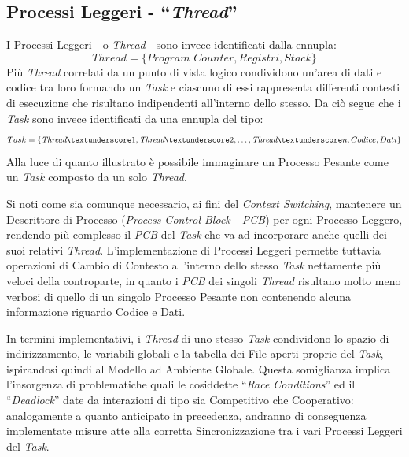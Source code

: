 \subsection{Processi Leggeri - ``\textit{Thread}''}
I Processi Leggeri - o \textit{Thread} - sono invece identificati dalla ennupla:
$$ Thread = \{\textit{Program Counter}, Registri, \textit{Stack}\} $$
Più \textit{Thread} correlati da un punto di vista logico condividono un'area di dati e codice tra loro formando un \textit{Task} e ciascuno di essi rappresenta differenti contesti di esecuzione che risultano indipendenti all'interno dello stesso. Da ciò segue che i \textit{Task} sono invece identificati da una ennupla del tipo:
$$ Task = \{\emph{Thread}\textunderscore 1, \emph{Thread}\textunderscore 2, \dots, \emph{Thread}\textunderscore n, Codice, Dati\} $$
Alla luce di quanto illustrato è possibile immaginare un Processo Pesante come un \textit{Task} composto da un solo \textit{Thread}. \par
Si noti come sia comunque necessario, ai fini del \textit{Context Switching}, mantenere un Descrittore di Processo (\textit{Process Control Block - PCB}) per ogni Processo Leggero, rendendo più complesso il \textit{PCB} del \textit{Task} che va ad incorporare anche quelli dei suoi relativi \textit{Thread}. L'implementazione di Processi Leggeri permette tuttavia operazioni di Cambio di Contesto all'interno dello stesso \textit{Task} nettamente più veloci della controparte, in quanto i \textit{PCB} dei singoli \textit{Thread} risultano molto meno verbosi di quello di un singolo Processo Pesante non contenendo alcuna informazione riguardo Codice e Dati. \par
In termini implementativi, i \textit{Thread} di uno stesso \textit{Task} condividono lo spazio di indirizzamento, le variabili globali e la tabella dei File aperti proprie del \textit{Task}, ispirandosi quindi al Modello ad Ambiente Globale. Questa somiglianza implica l'insorgenza di problematiche quali le cosiddette ``\textit{Race Conditions}'' ed il ``\textit{Deadlock}'' date da interazioni di tipo sia Competitivo che Cooperativo: analogamente a quanto anticipato in precedenza, andranno di conseguenza implementate misure atte alla corretta Sincronizzazione tra i vari Processi Leggeri del \textit{Task}.
